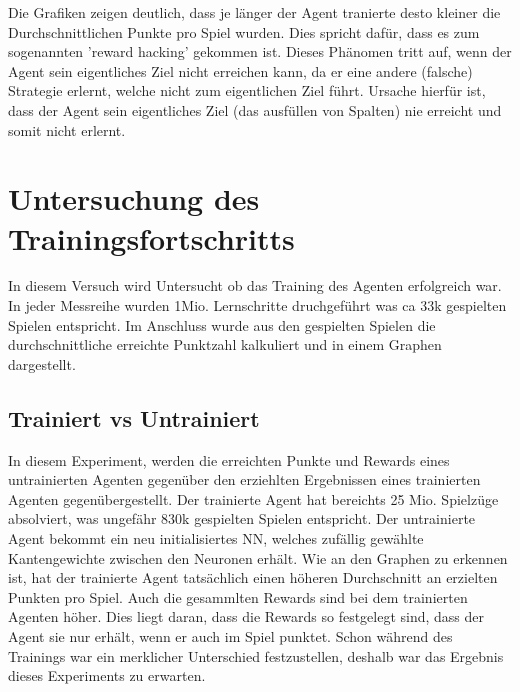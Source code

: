 Die Grafiken zeigen deutlich, dass je länger der Agent tranierte desto kleiner die Durchschnittlichen Punkte pro Spiel wurden.
Dies spricht dafür, dass es zum sogenannten 'reward hacking' gekommen ist. Dieses Phänomen tritt auf, wenn der Agent sein eigentliches Ziel nicht erreichen kann, da er eine andere (falsche) Strategie erlernt, welche nicht zum eigentlichen Ziel führt. Ursache hierfür ist, dass der Agent sein eigentliches Ziel (das ausfüllen von Spalten) nie erreicht und somit nicht erlernt.


\section{Untersuchung des Trainingsfortschritts}
In diesem Versuch wird Untersucht ob das Training des Agenten erfolgreich war. In jeder Messreihe wurden 1Mio. Lernschritte druchgeführt was ca 33k gespielten Spielen entspricht. Im Anschluss wurde aus den gespielten Spielen die durchschnittliche erreichte Punktzahl kalkuliert und in einem Graphen dargestellt.

\subsection{Trainiert vs Untrainiert}
In diesem Experiment, werden die erreichten Punkte und Rewards eines untrainierten Agenten gegenüber den erziehlten Ergebnissen eines trainierten Agenten gegenübergestellt. Der trainierte Agent hat bereichts 25 Mio. Spielzüge absolviert, was ungefähr 830k gespielten Spielen entspricht.
Der untrainierte Agent bekommt ein neu initialisiertes NN, welches zufällig gewählte Kantengewichte zwischen den Neuronen erhält.
Wie an den Graphen zu erkennen ist, hat der trainierte Agent tatsächlich einen höheren Durchschnitt an erzielten Punkten pro Spiel. Auch die gesammlten Rewards sind bei dem trainierten Agenten höher.
Dies liegt daran, dass die Rewards so festgelegt sind, dass der Agent sie nur erhält, wenn er auch im Spiel punktet.
Schon während des Trainings war ein merklicher Unterschied festzustellen, deshalb war das Ergebnis dieses Experiments zu erwarten.


